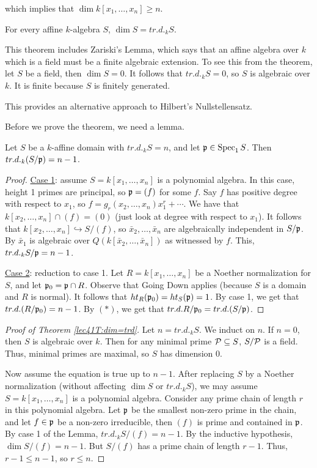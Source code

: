  which implies that $\dim k[x_1,\dots, x_n]\ge n$.
 \begin{theorem} \label{lec41T:dim=trd}
   For every affine $k$-algebra $S$, $\dim S=tr.d._k S$.
 \end{theorem}
 \begin{remark}
   This theorem includes Zariski's Lemma, which says that an affine algebra over $k$
   which is a field must be a finite algebraic extension. To see this from the theorem,
   let $S$ be a field, then $\dim S=0$. It follows that $tr.d._k S=0$, so $S$ is
   algebraic over $k$. It is finite because $S$ is finitely generated.

   This provides an alternative approach to Hilbert's Nullstellensatz.
 \end{remark}
 Before we prove the theorem, we need a lemma.
 \begin{lemma}
   Let $S$ be a $k$-affine domain with $tr.d._k S=n$, and let $\p\in \spec_1 S$. Then
   $tr.d._k (S/\p)=n-1$.
 \end{lemma}
 \begin{proof}
   \underline{Case 1}: assume $S=k[x_1,\dots, x_n]$ is a polynomial algebra. In this
   case, height 1 primes are principal, so $\p=(f)$ for some $f$. Say $f$ has positive
   degree with respect to $x_1$, so $f = g_r(x_2,\dots, x_n)x_1^r + \cdots$. We have
   that $k[x_2,\dots, x_n]\cap (f)=(0)$ (just look at degree with respect to $x_1$). It
   follows that $k[x_2,\dots, x_n]\hookrightarrow S/(f)$, so $\bar x_2,\dots, \bar x_n$
   are algebraically independent in $S/\p$. By $\bar x_1$ is algebraic over $Q(k[\bar
   x_2,\dots, \bar x_n])$ as witnessed by $f$. This, $tr.d._k S/\p=n-1$.

   \underline{Case 2}: reduction to case 1. Let $R=k[x_1,\dots, x_n]$ be a Noether
   normalization for $S$, and let $\p_0=\p\cap R$. Observe that Going Down applies
   (because $S$ is a domain and $R$ is normal). It follows that $ht_R(\p_0)=ht_S(\p)=1$.
   By case 1, we get that $tr.d. (R/\p_0)=n-1$. By $(\ast)$, we get that $tr.d.
   R/\p_0=tr.d. (S/\p)$.
 \end{proof}
 \begin{proof}[Proof of Theorem \ref{lec41T:dim=trd}]
   Let $n=tr.d._k S$. We induct on $n$. If $n=0$, then $S$ is algebraic over $k$. Then
   for any minimal prime $\P\subseteq S$, $S/\P$ is a field. Thus, minimal primes are
   maximal, so $S$ has dimension 0.

   Now assume the equation is true up to $n-1$. After replacing $S$ by a Noether
   normalization (without affecting $\dim S$ or $tr.d._k S$), we may assume
   $S=k[x_1,\dots, x_n]$ is a polynomial algebra. Consider any prime chain of length $r$
   in this polynomial algebra. Let $\p$ be the smallest non-zero prime in the chain, and
   let $f\in \p$ be a non-zero irreducible, then $(f)$ is prime and contained in $\p$. By
   case 1 of the Lemma, $tr.d._k S/(f)=n-1$. By the inductive hypothesis, $\dim
   S/(f)=n-1$. But $S/(f)$ has a prime chain of length $r-1$. Thus, $r-1\le n-1$, so
   $r\le n$.
 \end{proof}
